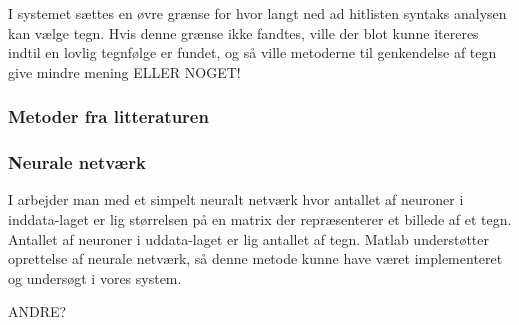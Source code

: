 I systemet sættes en øvre grænse for hvor langt ned ad hitlisten syntaks analysen kan vælge tegn. Hvis denne grænse ikke fandtes, ville der blot kunne itereres indtil en lovlig tegnfølge er fundet, og så ville metoderne til genkendelse af tegn give mindre mening ELLER NOGET!

\subsubsection{Metoder fra litteraturen}

\subsubsection*{Neurale netværk}
I \cite{kwas} arbejder man med et simpelt neuralt netværk hvor antallet af neuroner i inddata-laget er lig størrelsen på en matrix der repræsenterer et billede af et tegn. Antallet af neuroner i uddata-laget er lig antallet af tegn. Matlab understøtter oprettelse af neurale netværk, så denne metode kunne have været implementeret og undersøgt i vores system.

ANDRE?
